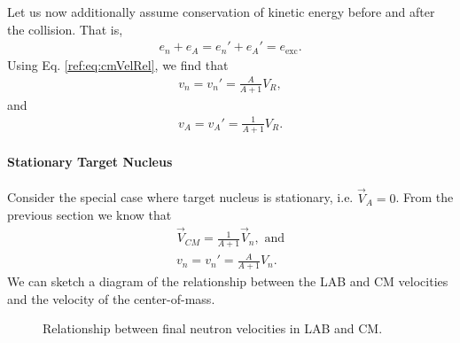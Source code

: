 \documentclass[11pt]{article}
\begin{document}
Let us now additionally assume conservation of kinetic energy before and after the collision.  That is, 
\begin{align*}
  e_n + e_A = e_n' + e_A' = e_{\text{exc}}.
\end{align*}
Using Eq. \eqref{ref:eq:cmVelRel}, we find that 
\begin{align*}
  v_n = v_n' = \frac{A}{A+1}V_R,
\end{align*}
and
\begin{align*}
  v_A = v_A' = \frac{1}{A+1}V_R.
\end{align*}

\paragraph{Stationary Target Nucleus}
\label{sec:orgheadline2}
Consider the special case where target nucleus is stationary, i.e. \(\vec{V}_A = 0\).  From the previous section we know that
\begin{align*}
  \vec{V}_{CM} = \frac{1}{A+1} \vec{V}_n, \text{ and} \\
  v_n = v_n' = \frac{A}{A+1}V_n.
\end{align*}
We can sketch a diagram of the relationship between the LAB and CM velocities and the velocity of the center-of-mass.

\begin{figure}
\centering
{}
\caption{Relationship between final neutron velocities in LAB and CM.}
\end{figure}
\end{document}
